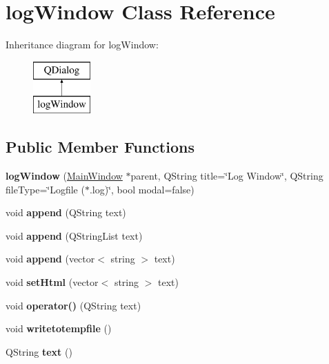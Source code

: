 \hypertarget{classlog_window}{}\section{log\+Window Class Reference}
\label{classlog_window}
Inheritance diagram for log\+Window\+:\begin{figure}[H]
\begin{center}
\leavevmode
\includegraphics[height=2.000000cm]{classlog_window}
\end{center}
\end{figure}
\subsection*{Public Member Functions}
\begin{DoxyCompactItemize}
\item 
\mbox{\label{classlog_window_af62138368d00784f8eb22c0853741fb6}} 
{\bfseries log\+Window} (\hyperlink{class_main_window}{Main\+Window} $\ast$parent, Q\+String title=\char`\"{}Log Window\char`\"{}, Q\+String file\+Type=\char`\"{}Logfile ($\ast$.log)\char`\"{}, bool modal=false)
\item 
\mbox{\label{classlog_window_a7b30dd5823881aa27752cc7870aa680e}} 
void {\bfseries append} (Q\+String text)
\item 
\mbox{\label{classlog_window_a1935343d73012bb7c08b8937e92cec26}} 
void {\bfseries append} (Q\+String\+List text)
\item 
\mbox{\label{classlog_window_acc4cf7d3b392c54097c69545740dbd92}} 
void {\bfseries append} (vector$<$ string $>$ text)
\item 
\mbox{\label{classlog_window_a10b99326889a9ce8c79092177be85ef5}} 
void {\bfseries set\+Html} (vector$<$ string $>$ text)
\item 
\mbox{\label{classlog_window_a5cc5e354d2eeda913df1fcdce61944df}} 
void {\bfseries operator()} (Q\+String text)
\item 
\mbox{\label{classlog_window_a323b511ced9ea234ba9d97a2aebe4c76}} 
void {\bfseries writetotempfile} ()
\item 
\mbox{\label{classlog_window_a994dacdbd84665f79513a69461507869}} 
Q\+String {\bfseries text} ()
\end{DoxyCompactItemize}



